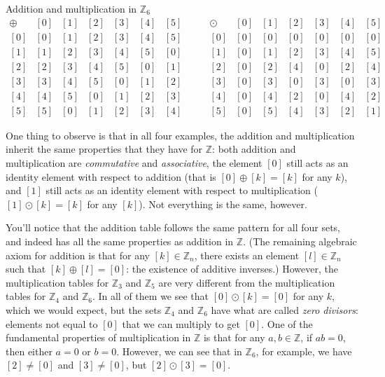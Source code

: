 \documentclass[letterpaper,12pt]{article}
\newcommand{\Z}{\mathbb{Z}}
\begin{document}
\begin{center}
\medskip

Addition and multiplication in $\Z_6$
\[
    \begin{array}{c|cccccc}
  \oplus & [0] & [1] & [2] & [3] & [4] & [5]\\
\hline
{[0]}& [0] & [1] & [2] & [3] & [4] & [5]\\
{[1]}& [1] & [2] & [3] & [4] & [5] & [0]\\
{[2]}& [2] & [3] & [4] & [5] & [0] & [1]\\
{[3]}& [3] & [4] & [5] & [0] & [1] & [2]\\
{[4]}& [4] & [5] & [0] & [1] & [2] & [3]\\
{[5]}& [5] & [0] & [1] & [2] & [3] & [4]
 \end{array} \quad \quad
    \begin{array}{c|cccccc}
  \odot & [0] & [1] & [2] & [3] & [4] & [5]\\
\hline
{[0]}& [0] & [0] & [0] & [0] & [0] & [0]\\
{[1]}& [0] & [1] & [2] & [3] & [4] & [5]\\
{[2]}& [0] & [2] & [4] & [0] & [2] & [4]\\
{[3]}& [0] & [3] & [0] & [3] & [0] & [3]\\
{[4]}& [0] & [4] & [2] & [0] & [4] & [2]\\
{[5]}& [0] & [5] & [4] & [3] & [2] & [1]
 \end{array} 
\]
\end{center}
One thing to observe is that in all four examples, the addition and multiplication inherit the same properties that they have for $\Z$: both addition and multiplication are {\em commutative} and {\em associative}, the element $[0]$ still acts as an identity element with respect to addition (that is $[0]\oplus [k] = [k]$ for any $k$), and $[1]$ still acts as an identity element with respect to multiplication ($[1]\odot [k] = [k]$ for any $[k]$). Not everything is the same, however.


You'll notice that the addition table follows the same pattern for all four sets, and indeed has all the same properties as addition in $\Z$. (The remaining algebraic axiom for addition is that for any $[k]\in \Z_n$, there exists an element $[l]\in\Z_n$ such that $[k]\oplus [l] = [0]$: the existence of additive inverses.) However, the multiplication tables for $\Z_3$ and $\Z_5$ are very different from the multiplication tables for $\Z_4$ and $\Z_6$. In all of them we see that $[0]\odot [k] = [0]$ for any $k$, which we would expect, but the sets $\Z_4$ and $\Z_6$ have what are called {\em zero divisors}: elements not equal to $[0]$ that we can multiply to get $[0]$. One of the fundamental properties of multiplication in $\Z$ is that for any $a,b \in \Z$, if $ab=0$, then either $a=0$ or $b=0$. However, we can see that in $\Z_6$, for example, we have $[2]\neq [0]$ and $[3]\neq [0]$, but $[2]\odot [3] = [0]$.
\end{document}
